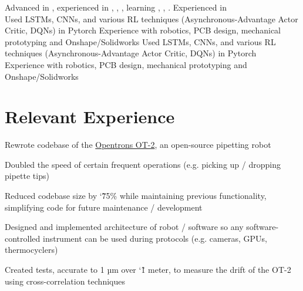 \documentclass[]{deedy-resume-openfont}
\begin{document}

\begin{minipage}[t]{\textwidth}
   Advanced in , experienced in , , , learning , , . Experienced in \\
  \ifdef{\software} {
     Used LSTMs, CNNs, and various RL techniques (Asynchronous-Advantage Actor Critic, DQNs) in Pytorch
  } {
    \ifdef{\robotics} {
       Experience with robotics, PCB design, mechanical prototyping and Onshape/Solidworks
    } { 
       Used LSTMs, CNNs, and various RL techniques (Asynchronous-Advantage Actor Critic, DQNs) in Pytorch \\
       Experience with robotics, PCB design, mechanical prototyping and Onshape/Solidworks
    }
  }
\end{minipage}

\vspace{12pt}

\section{Relevant Experience}

\begin{tightemize}
    \item Rewrote codebase of the \href{https://opentrons.com/ot-2/}{Opentrons OT-2}, an open-source pipetting robot
    \item Doubled the speed of certain frequent operations (e.g. picking up / dropping pipette tips)
    \item Reduced codebase size by \char`\~ 75\% while maintaining previous functionality, simplifying code for future maintenance / development
    \item Designed and implemented architecture of robot / software so any software-controlled instrument can be used during protocols (e.g. cameras, GPUs, thermocyclers)
    \item Created tests, accurate to 1 µm over \char`\~ 1 meter, to measure the drift of the OT-2 using cross-correlation techniques
\end{tightemize}
\end{document}
